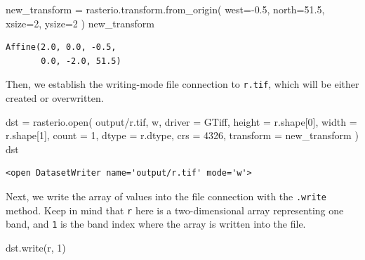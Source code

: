 \documentclass[
  letterpaper,
]{krantz}
\newenvironment{Shaded}{\begin{snugshade}}{\end{snugshade}}
\newcommand{\BuiltInTok}[1]{\textcolor[rgb]{0.00,0.23,0.31}{#1}}
\newcommand{\DecValTok}[1]{\textcolor[rgb]{0.68,0.00,0.00}{#1}}
\newcommand{\FloatTok}[1]{\textcolor[rgb]{0.68,0.00,0.00}{#1}}
\newcommand{\NormalTok}[1]{\textcolor[rgb]{0.00,0.23,0.31}{#1}}
\newcommand{\OperatorTok}[1]{\textcolor[rgb]{0.37,0.37,0.37}{#1}}
\newcommand{\StringTok}[1]{\textcolor[rgb]{0.13,0.47,0.30}{#1}}
\begin{document}
\begin{Shaded}
\begin{Highlighting}[]
\NormalTok{new\_transform }\OperatorTok{=}\NormalTok{ rasterio.transform.from\_origin(}
\NormalTok{    west}\OperatorTok{={-}}\FloatTok{0.5}\NormalTok{, }
\NormalTok{    north}\OperatorTok{=}\FloatTok{51.5}\NormalTok{, }
\NormalTok{    xsize}\OperatorTok{=}\DecValTok{2}\NormalTok{, }
\NormalTok{    ysize}\OperatorTok{=}\DecValTok{2}
\NormalTok{)}
\NormalTok{new\_transform}
\end{Highlighting}
\end{Shaded}

\begin{verbatim}
Affine(2.0, 0.0, -0.5,
       0.0, -2.0, 51.5)
\end{verbatim}

Then, we establish the writing-mode file connection to \texttt{r.tif},
which will be either created or overwritten.

\begin{Shaded}
\begin{Highlighting}[]
\NormalTok{dst }\OperatorTok{=}\NormalTok{ rasterio.}\BuiltInTok{open}\NormalTok{(}
    \StringTok{\textquotesingle{}output/r.tif\textquotesingle{}}\NormalTok{, }\StringTok{\textquotesingle{}w\textquotesingle{}}\NormalTok{, }
\NormalTok{    driver }\OperatorTok{=} \StringTok{\textquotesingle{}GTiff\textquotesingle{}}\NormalTok{,}
\NormalTok{    height }\OperatorTok{=}\NormalTok{ r.shape[}\DecValTok{0}\NormalTok{],}
\NormalTok{    width }\OperatorTok{=}\NormalTok{ r.shape[}\DecValTok{1}\NormalTok{],}
\NormalTok{    count }\OperatorTok{=} \DecValTok{1}\NormalTok{,}
\NormalTok{    dtype }\OperatorTok{=}\NormalTok{ r.dtype,}
\NormalTok{    crs }\OperatorTok{=} \DecValTok{4326}\NormalTok{,}
\NormalTok{    transform }\OperatorTok{=}\NormalTok{ new\_transform}
\NormalTok{)}
\NormalTok{dst}
\end{Highlighting}
\end{Shaded}

\begin{verbatim}
<open DatasetWriter name='output/r.tif' mode='w'>
\end{verbatim}

Next, we write the array of values into the file connection with the
\texttt{.write} method. Keep in mind that \texttt{r} here is a
two-dimensional array representing one band, and \texttt{1} is the band
index where the array is written into the file.

\begin{Shaded}
\begin{Highlighting}[]
\NormalTok{dst.write(r, }\DecValTok{1}\NormalTok{)}
\end{Highlighting}
\end{Shaded}
\end{document}
